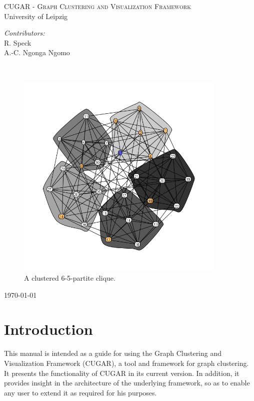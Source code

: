 \documentclass[a4paper, 11pt]{article}
\begin{document}
\thispagestyle{empty}

\begin{titlepage}
\begin{center}

\textsc{\LARGE CUGAR \Large - Graph Clustering and Visualization Framework}\\[1.5cm]
\textsc{\Large} University of Leipzig\\[0.5cm]

\begin{minipage}{0.7\textwidth}
	\begin{flushleft} 
		\large
		\emph{Contributors:}\\
		R. Speck\\
		A.-C. Ngonga Ngomo
	\end{flushleft}
\end{minipage}\\
[2cm]
\begin{figure}[h!]
	\centering
	\includegraphics[height=10cm]{img/clique.png}
	\caption{A clustered 6-5-partite clique.}
	\label{fig:clique}
\end{figure}
\vfill

{\large \today}
\end{center}
\end{titlepage}
\tableofcontents

\newpage
\section{Introduction}
	This manual is intended as a guide for using the Graph Clustering and Visualization Framework (CUGAR), 
	a tool and framework for graph clustering. It presents the functionality of CUGAR in its current version. 
	In addition, it provides insight in the architecture of the underlying framework, so as to enable any user 
	to extend it as required for his purposes.
\end{document}
